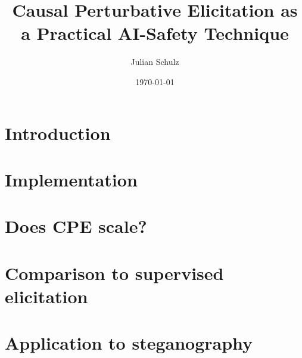 \documentclass[11pt,a4paper]{article}
\title{Causal Perturbative Elicitation as a Practical AI-Safety Technique}
\author{Julian Schulz}
\date{\today}
\begin{document}
\maketitle

\section{Introduction}


\section{Implementation}
\label{sec:implementation}


\section{Does CPE scale?}
\label{sec:scaling}


\section{Comparison to supervised elicitation}
\label{sec:supervised}


\section{Application to steganography}
\label{sec:steganography}




\appendix

\end{document}

